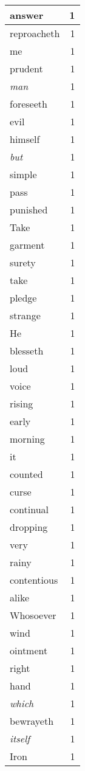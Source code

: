 \begin{center}
\begin{longtable}{l|r}
answer & 1\\ \hline 
reproacheth & 1\\ \hline 
me & 1\\ \hline 
prudent & 1\\ \hline 
\emph{man} & 1\\ \hline 
foreseeth & 1\\ \hline 
evil & 1\\ \hline 
himself & 1\\ \hline 
\emph{but} & 1\\ \hline 
simple & 1\\ \hline 
pass & 1\\ \hline 
punished & 1\\ \hline 
Take & 1\\ \hline 
garment & 1\\ \hline 
surety & 1\\ \hline 
take & 1\\ \hline 
pledge & 1\\ \hline 
strange & 1\\ \hline 
He & 1\\ \hline 
blesseth & 1\\ \hline 
loud & 1\\ \hline 
voice & 1\\ \hline 
rising & 1\\ \hline 
early & 1\\ \hline 
morning & 1\\ \hline 
it & 1\\ \hline 
counted & 1\\ \hline 
curse & 1\\ \hline 
continual & 1\\ \hline 
dropping & 1\\ \hline 
very & 1\\ \hline 
rainy & 1\\ \hline 
contentious & 1\\ \hline 
alike & 1\\ \hline 
Whosoever & 1\\ \hline 
wind & 1\\ \hline 
ointment & 1\\ \hline 
right & 1\\ \hline 
hand & 1\\ \hline 
\emph{which} & 1\\ \hline 
bewrayeth & 1\\ \hline 
\emph{itself} & 1\\ \hline 
Iron & 1\\ \hline 

\end{longtable}
\end{center}

